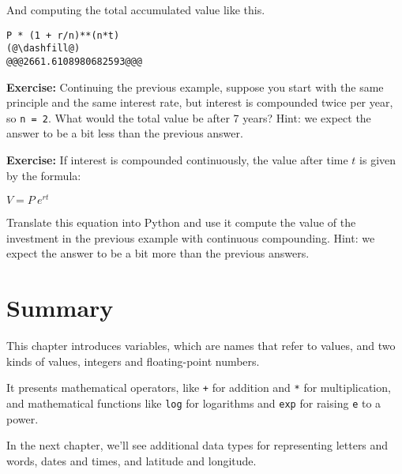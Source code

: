 And computing the total accumulated value like this.

\begin{lstlisting}[]
P * (1 + r/n)**(n*t)
(@\dashfill@)
@@@2661.6108980682593@@@
\end{lstlisting}

\textbf{Exercise:} Continuing the previous example, suppose you start
with the same principle and the same interest rate, but interest is
compounded twice per year, so \passthrough{\lstinline!n = 2!}. What
would the total value be after 7 years? Hint: we expect the answer to be
a bit less than the previous answer.

\textbf{Exercise:} If interest is compounded continuously, the value
after time \(t\) is given by the formula:

\(V=P~e^{rt}\)

Translate this equation into Python and use it compute the value of the
investment in the previous example with continuous compounding. Hint: we
expect the answer to be a bit more than the previous answers.

\hypertarget{summary}{%
\section{Summary}\label{summary}}

This chapter introduces variables, which are names that refer to values,
and two kinds of values, integers and floating-point numbers.

It presents mathematical operators, like \passthrough{\lstinline!+!} for
addition and \passthrough{\lstinline!*!} for multiplication, and
mathematical functions like \passthrough{\lstinline!log!} for logarithms
and \passthrough{\lstinline!exp!} for raising
\passthrough{\lstinline!e!} to a power.

In the next chapter, we'll see additional data types for representing
letters and words, dates and times, and latitude and longitude.

